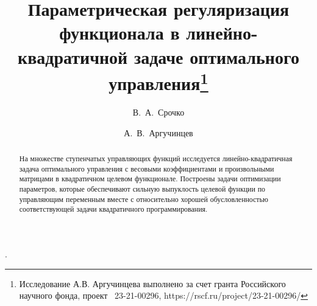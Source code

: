 \usepackage{todonotes} %

\usepackage[russian]{nla}


\fi

\title{Параметрическая регуляризация функционала в линейно-квадратичной задаче оптимального
 управления\thanks{Исследование А.В. Аргучинцева выполнено за счет гранта Российского научного фонда, проект \textnumero~23-21-00296, https://rscf.ru/project/23-21-00296/}}.

\author{В.~А.~Срочко  %
  \and  %
  А.~В.~Аргучинцев
  } %


\maketitle

\begin{abstract}
На множестве ступенчатых управляющих функций исследуется ли\-ней\-но-квад\-ра\-тич\-ная задача оптимального управления с весовыми коэффициентами и произвольными матрицами в квадратичном целевом функционале. Построены задачи оптимизации параметров, которые обеспечивают сильную выпуклость целевой функции по управляющим переменным вместе с относительно хорошей обусловленностью соответствующей задачи квадратичного программирования.

\end{abstract}

